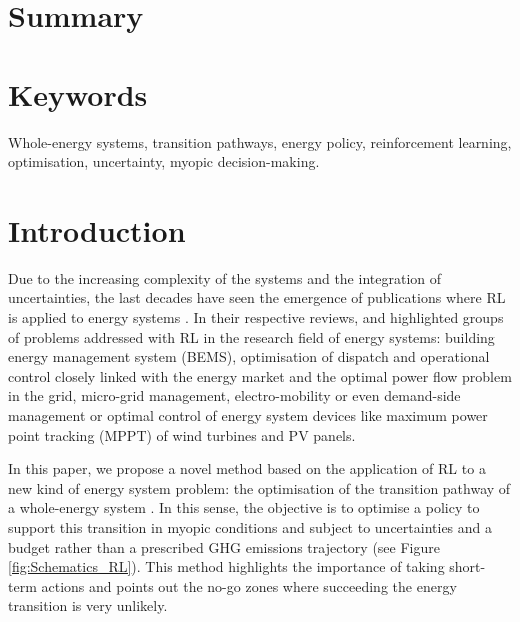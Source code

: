 \documentclass[11pt,twoside,a4paper,english]{article}
\begin{document}
\section{Summary}

\section{Keywords}
Whole-energy systems, transition pathways, energy policy, reinforcement learning, optimisation, uncertainty, myopic decision-making.


\section{Introduction}
\label{sec:intro}


Due to the increasing complexity of the systems and the integration of uncertainties, the last decades have seen the emergence of publications where \gls{RL} is applied to energy systems \cite{cao2020reinforcement,perera2021applications}. In their respective reviews, \citet{cao2020reinforcement} and \citet{perera2021applications} highlighted groups of problems addressed with \gls{RL} in the research field of energy systems: building energy management system (BEMS), optimisation of dispatch and operational control closely linked with the energy market and the optimal power flow problem in the grid, micro-grid management, electro-mobility or even demand-side management or optimal control of energy system devices like maximum power point tracking (MPPT) of wind turbines and \gls{PV} panels.  

In this paper, we propose a novel method based on the application of \gls{RL} to a new kind of energy system problem: the optimisation of the transition pathway of a whole-energy system . In this sense, the objective is to optimise a policy to support this transition in myopic conditions and subject to uncertainties and a  budget rather than a prescribed \gls{GHG} emissions trajectory (see Figure \ref{fig:Schematics_RL}). This method highlights the importance of taking short-term actions and points out the no-go zones where succeeding the energy transition is very unlikely.
\end{document}
